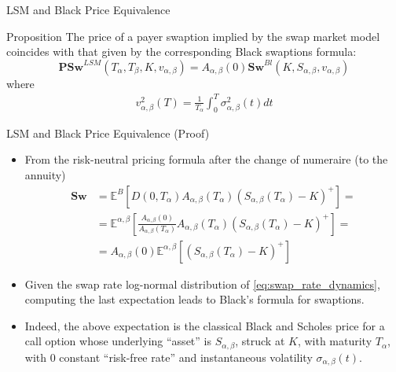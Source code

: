 \documentclass{beamer}
\begin{document}
\begin{frame}{LSM and Black Price Equivalence}
	\begin{block}{Proposition}
		The price of a payer swaption implied by the swap market model coincides with that given by the corresponding Black swaptions formula:
		\begin{equation}
			\textbf{PSw}^{LSM}(T_\alpha,T_\beta,K,v_{\alpha,\beta})=
			A_{\alpha, \beta}(0) \textbf{Sw}^{Bl}(K,S_{\alpha,\beta}, v_{\alpha,\beta})
			\label{eq:black_swaptions}
		\end{equation}
		where
		\begin{equation*}
			\begin{gathered}
				v_{\alpha,\beta}^2(T) =\frac{1}{T_\alpha}\int_0^T\sigma^2_{\alpha,\beta}(t)dt
			\end{gathered}
		\end{equation*}
	\end{block}
\end{frame}

\begin{frame}{LSM and Black Price Equivalence (Proof)}
	\begin{itemize}
		\item From the risk-neutral pricing formula after the change of numeraire (to the annuity)
		\begin{equation*}
			\begin{aligned}
				\textbf{Sw}&=\mathbb{E}^B\left[D(0,T_\alpha)A_{\alpha,\beta}(T_\alpha)(S_{\alpha,\beta}(T_\alpha)-K)^+\right] = \\
				&=\mathbb{E}^{\alpha,\beta}\left[\frac{A_{\alpha,\beta}(0)}{A_{\alpha,\beta}(T_\alpha)}A_{\alpha,\beta}(T_\alpha)(S_{\alpha,\beta}(T_\alpha)-K)^+\right] = \\
				&= A_{\alpha,\beta}(0)\mathbb{E}^{\alpha,\beta}\left[(S_{\alpha,\beta}(T_\alpha)-K)^+\right]
			\end{aligned}
		\end{equation*}
		\item Given the swap rate log-normal distribution of \cref{eq:swap_rate_dynamics}, computing the last expectation leads to Black’s formula for swaptions.
		\item Indeed, the above expectation is \textcolor{maincolor}{the classical Black and Scholes price for a call option whose underlying “asset” is $S_{\alpha,\beta}$, struck at $K$, with maturity $T_\alpha$, with 0 constant “risk-free rate” and instantaneous volatility $\sigma_{\alpha,\beta}(t)$.}
	\end{itemize}
\end{frame}
\end{document}
